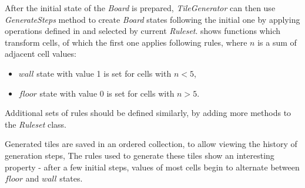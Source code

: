 \documentclass[12pt]{report}
\begin{document}
After the initial state of the \textit{Board} is prepared, \textit{TileGenerator} can then use \textit{GenerateSteps} method to create \textit{Board} states following the initial one by applying operations defined in and selected by current \textit{Ruleset}.  shows functions which transform cells, of which the first one applies following rules, where $n$ is a sum of adjacent cell values:

\begin{itemize}
	\item $wall$ state with value 1 is set for cells with $n < 5$,
	\item $floor$ state with value 0 is set for cells with $n > 5$.
\end{itemize}

Additional sets of rules should be defined similarly, by adding more methods to the \textit{Ruleset} class. 



Generated tiles are saved in an ordered collection, to allow viewing the history of generation steps, The rules used to generate these tiles show an interesting property - after a few initial steps, values of most cells begin to alternate between $floor$ and $wall$ states.
\end{document}
